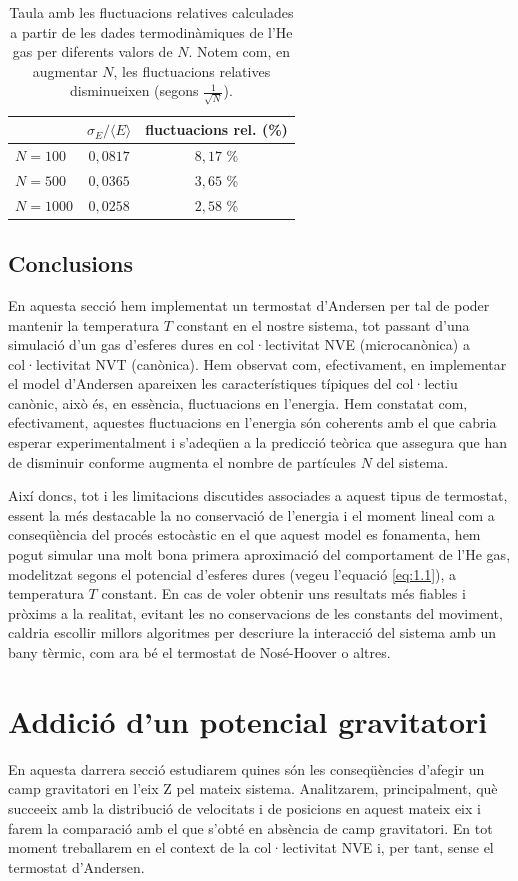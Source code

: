 \documentclass[a4paper,10.5pt]{report}
\begin{document}
\begin{table}[h]
	\centering
	\caption{Taula amb les fluctuacions relatives calculades a partir de les dades termodinàmiques de l'He gas per diferents valors de $N$. Notem com, en augmentar $N$, les fluctuacions relatives disminueixen (segons $\frac{1}{\sqrt{N}}$).}
	\begin{tabular}{l c c}
		\toprule
		 & $\sigma_E / \langle E \rangle$ & fluctuacions rel. (\%) \\
		\midrule
		$N = 100$ 	& $0,0817$ & $8,17$ \% \\
		$N = 500$   & $0,0365$ & $3,65$ \% \\
		$N = 1000$  & $0,0258$ & $2,58$ \% \\
		\bottomrule
	\end{tabular}
	\label{tab:1.2}
\end{table}

\subsection{Conclusions}
En aquesta secció hem implementat un termostat d'Andersen per tal de poder mantenir la temperatura $T$ constant en el nostre sistema, tot passant d'una simulació d'un gas d'esferes dures en col·lectivitat NVE (microcanònica) a col·lectivitat NVT (canònica). Hem observat com, efectivament, en implementar el model d'Andersen apareixen les característiques típiques del col·lectiu canònic, això és, en essència, fluctuacions en l'energia. Hem constatat com, efectivament, aquestes fluctuacions en l'energia són coherents amb el que cabria esperar experimentalment i s'adeqüen a la predicció teòrica que assegura que han de disminuir conforme augmenta el nombre de partícules $N$ del sistema. 

Així doncs, tot i les limitacions discutides associades a aquest tipus de termostat, essent la més destacable la no conservació de l'energia i el moment lineal com a conseqüència del procés estocàstic en el que aquest model es fonamenta, hem pogut simular una molt bona primera aproximació del comportament de l'He gas, modelitzat segons el potencial d'esferes dures (vegeu l'equació \eqref{eq:1.1}), a temperatura $T$ constant. En cas de voler obtenir uns resultats més fiables i pròxims a la realitat, evitant les no conservacions de les constants del moviment, caldria escollir millors algoritmes per descriure la interacció del sistema amb un bany tèrmic, com ara bé el termostat de Nosé-Hoover o altres.

\section{Addició d'un potencial gravitatori} 
En aquesta darrera secció estudiarem quines són les conseqüències d'afegir un camp gravitatori en l'eix Z pel mateix sistema. Analitzarem, principalment, què succeeix amb la distribució de velocitats i de posicions en aquest mateix eix i farem la comparació amb el que s'obté en absència de camp gravitatori. En tot moment treballarem en el context de la col·lectivitat NVE i, per tant, sense el termostat d'Andersen.
\end{document}
